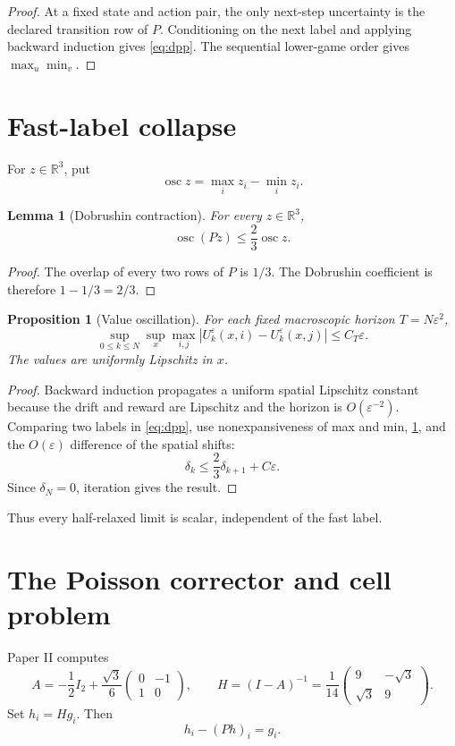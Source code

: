 \documentclass[11pt,reqno]{amsart}
\newtheorem{proposition}[theorem]{Proposition}
\newtheorem{lemma}[theorem]{Lemma}
\theoremstyle{definition}
\theoremstyle{remark}
\newcommand{\R}{\mathbb R}
\newcommand{\osc}{\operatorname{osc}}
\newcommand{\abs}[1]{\left\lvert #1\right\rvert}
\begin{document}
\begin{proof}
At a fixed state and action pair, the only next-step uncertainty is the
declared transition row of $P$.  Conditioning on the next label and applying
backward induction gives \eqref{eq:dpp}.  The sequential lower-game order
gives $\max_u\min_v$.
\end{proof}

\section{Fast-label collapse}\label{sec:collapse}

For $z\in\R^3$, put
\[
 \osc z=\max_i z_i-\min_i z_i.
\]

\begin{lemma}[Dobrushin contraction]\label{lem:dobrushin}
For every $z\in\R^3$,
\[
 \osc(Pz)\le\frac23\osc z.
\]
\end{lemma}

\begin{proof}
The overlap of every two rows of $P$ is $1/3$.  The Dobrushin coefficient is
therefore $1-1/3=2/3$.
\end{proof}

\begin{proposition}[Value oscillation]\label{prop:oscillation}
For each fixed macroscopic horizon $T=N\varepsilon^2$,
\[
 \sup_{0\le k\le N}\sup_x\max_{i,j}
 \abs{U_k^\varepsilon(x,i)-U_k^\varepsilon(x,j)}
 \le C_T\varepsilon.
\]
The values are uniformly Lipschitz in $x$.
\end{proposition}

\begin{proof}
Backward induction propagates a uniform spatial Lipschitz constant because
the drift and reward are Lipschitz and the horizon is $O(\varepsilon^{-2})$.
Comparing two labels in \eqref{eq:dpp}, use nonexpansiveness of max and min,
\cref{lem:dobrushin}, and the $O(\varepsilon)$ difference of the spatial
shifts:
\[
 \delta_k\le\frac23\delta_{k+1}+C\varepsilon.
\]
Since $\delta_N=0$, iteration gives the result.
\end{proof}

Thus every half-relaxed limit is scalar, independent of the fast label.

\section{The Poisson corrector and cell problem}\label{sec:cell}

Paper II computes
\[
 A=-\frac12I_2+\frac{\sqrt3}{6}
 \begin{pmatrix}0&-1\\1&0\end{pmatrix},
 \qquad
 H=(I-A)^{-1}
 =\frac1{14}
 \begin{pmatrix}9&-\sqrt3\\\sqrt3&9\end{pmatrix}.
\]
Set $h_i=Hg_i$.  Then
\[
 h_i-(Ph)_i=g_i.
\]
\end{document}
